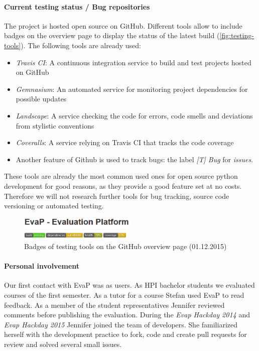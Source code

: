 \paragraph{Current testing status / Bug repositories}
The project is hosted open source on GitHub.
Different tools allow to include badges on the overview page to display the status of the latest build (\autoref{fig:testing-tools}).
The following tools are already used:
\begin{itemize}
    \item \emph{Travis CI}: 
    A continuous integration service to build and test projects hosted on GitHub
    \item \emph{Gemnasium}:
     An automated service for monitoring project dependencies for possible updates
     \item \emph{Landscape}:
     A service checking the code for errors, code smells and deviations from stylistic conventions
     \item  \emph{Coveralls}:
     A service relying on Travis CI that tracks the code coverage
     \item 
     Another feature of Github is used to track bugs: the label \emph{[T] Bug} for \emph{issues}.
\end{itemize}
These tools are already the most common used ones for open source python development for good reasons, as they provide a good feature set at no costs.
Therefore we will not research further tools for bug tracking, source code versioning or automated testing.
\begin{figure}[h]
    \centering
    \includegraphics[width=0.5\textwidth, keepaspectratio]{graphics/testing-tools-github}
    \caption{Badges of testing tools on the GitHub overview page (01.12.2015)}
    \label{fig:testing-tools}
\end{figure}


\paragraph{Personal involvement}
Our first contact with EvaP was as users. 
As HPI bachelor students we evaluated courses of the first semester.
As a tutor for a course Stefan used EvaP to read feedback.
As a member of the student representatives Jennifer reviewed comments before publishing the evaluation.
During the \emph{Evap Hackday 2014} and \emph{Evap Hackday 2015} Jennifer joined the team of developers.
She familiarized herself with the development practice to fork, code and create pull requests for review and solved several small issues.
